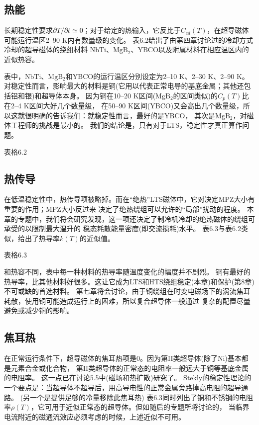 \subsection{热能}
长期稳定性要求$\partial T/\partial t\simeq 0$；对于给定的热输入，它反比于$C_{cd}(T)$，在超导磁体
可能运行温区2--90 K内有数量级的变化。
表6.2给出了由第四章讨论过的冷却方式冷却的超导磁体的绕组材料
NbTi、$\mathrm{MgB_2}$、YBCO以及附属材料在相应温区内的近似热容。

表中，NbTi、$\mathrm{MgB_2}$和YBCO的运行温区分别设定为2--10 K、2--30 K、2--90 K。
对稳定性而言，影响最大的材料是铜(它用以代表正常电导的基底金属；其他还包括铝和银)和超导体本身。
因为铜在10--20 K区间($\mathrm{MgB_2}$的区间类似)的$C_p(T)$比在2--4 K区间大好几个数量级，
在50--90 K区间(YBCO)又会高出几个数量级，所以这就很明确的告诉我们：就稳定性而言，最好的是YBCO，
其次是$\mathrm{MgB_2}$，对磁体工程师的挑战是最小的。
我们的结论是，只有对于LTS，稳定性才真正算作问题。

表格6.2

\subsection{热传导}
在低温稳定性中，热传导项被略掉。而在“绝热”LTS磁体中，它对决定MPZ大小有重要的作用；MPZ大小反过来
决定了绝热绕组可以允许的“局部”扰动的程度。
本章的专题中，我们将会研究发现，这一项还决定了制冷机冷却的绝热磁体的绕组可承受的以限制最大温升的
稳态耗散能量密度(即交流损耗)水平。
表6.3与表6.2类似，给出了热导率$k(T)$的近似值。

表格6.3

和热容不同，表中每一种材料的热导率随温度变化的幅度并不剧烈。
铜有最好的热导率，比其他材料好很多。这让它成为LTS和HTS绕组稳定(本章)和保护(第8章)不可或缺的首选材料。
第七章将会讨论，由于铜绕组在时变电磁场下的涡流焦耳耗散，使用铜可能造成运行上的困难，所以复合超导体一般通过
复杂的配置尽量避免或减少铜的影响。

\subsection{焦耳热}
在正常运行条件下，超导磁体的焦耳热项是0。因为第II类超导体(除了Ni)基本都是元素合金或化合物，
第II类超导体的正常态的电阻率一般远大于铜等基底金属的电阻率。
这一点已在讨论5.5中(磁场和热扩散)研究了。
Stekly的稳定性理论的一个要点是：当超导体不超导后，用高导电性的正常金属旁路掉高电阻的超导通路。
(另一个是提供足够的冷量移除此焦耳热)
表6.3同时列出了铜和不锈钢的电阻率$\rho(T)$，它可用于近似正常态的超导体。但如随后的专题所将讨论的，
当临界电流附近的磁通流效应必须考虑的时候，上述近似不可用。

